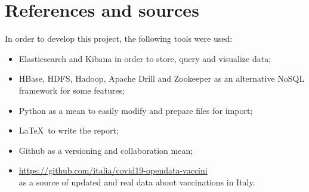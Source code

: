 \documentclass[12pt, a4paper]{article}
\begin{document}
\clearpage

\section{References and sources}

In order to develop this project, the following tools were used:

\begin{itemize}
    \item Elasticsearch and Kibana in order to store, query and visualize data;
    \item HBase, HDFS, Hadoop, Apache Drill and Zookeeper as an alternative NoSQL 
      framework for some features;
    \item Python as a mean to easily modify and prepare files for import;
    \item \LaTeX~to write the report;
    \item Github as a versioning and collaboration mean;
    \item \url{https://github.com/italia/covid19-opendata-vaccini} \\
        as a source of updated and real data about vaccinations in Italy.
\end{itemize}

\clearpage
\end{document}
